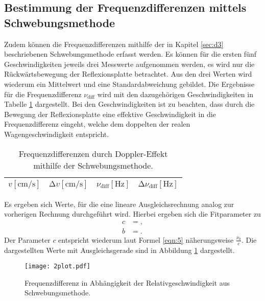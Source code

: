 \subsection{Bestimmung der Frequenzdifferenzen mittels Schwebungsmethode}
Zudem können die Frequenzdifferenzen mithilfe der in Kapitel \ref{sec:d3} beschriebenen Schwebungsmethode erfasst werden.
Es können für die ersten fünf Geschwindigkeiten jeweils drei Messwerte aufgenommen werden, es wird nur die Rückwärtsbewegung der Reflexionsplatte betrachtet.
Aus den drei Werten wird wiederum ein Mittelwert und eine Standardabweichung gebildet.
Die Ergebnisse für die Frequenzdifferenz $\nu_{\text{diff}}$ wird mit den dazugehörigen Geschwindigkeiten in Tabelle \ref{tab:diffe2} dargestellt.
Bei den Geschwindigkeiten ist zu beachten, dass durch die Bewegung der Reflexionsplatte eine effektive Geschwindigkeit in die Frequenzdifferenz eingeht, welche dem doppelten der realen Wagengeschwindigkeit entspricht.
\begin{table}
  \centering
  \caption{Frequenzdifferenzen durch Doppler-Effekt mithilfe der Schwebungsmethode.}
  \label{tab:diffe2}
  \begin{tabular}{c c c c}
    \toprule
    {$v [\si{\centi\metre\per\second}]$} & {$\increment{v} [\si{\centi\metre\per\second}]$} & {$\nu_{\text{diff}} [\si{\hertz}]$} & {$\increment{\nu_{\text{diff}}} [\si{\hertz}]$}\\
    \midrule
    
    \bottomrule
  \end{tabular}
\end{table}
Es ergeben sich Werte, für die eine lineare Ausgleichsrechnung analog zur vorherigen Rechnung durchgeführt wird.
Hierbei ergeben sich die Fitparameter zu
\begin{align*}
  c &= , \\
  b &= .
\end{align*}
Der Parameter $c$ entspricht wiederum laut Formel \ref{eqn:5} näherungsweise $\frac{ \nu_0}{c}$.
Die dargestellten Werte mit Ausgleichsgerade sind in Abbildung \ref{afig:2} dargestellt.
\begin{figure}
  \centering
  \texttt{[image: 2plot.pdf]}
  \caption{Frequenzdifferenz in Abhängigkeit der Relativgeschwindigkeit aus Schwebungsmethode.}
  \label{afig:2}
\end{figure}
%
%    
%
